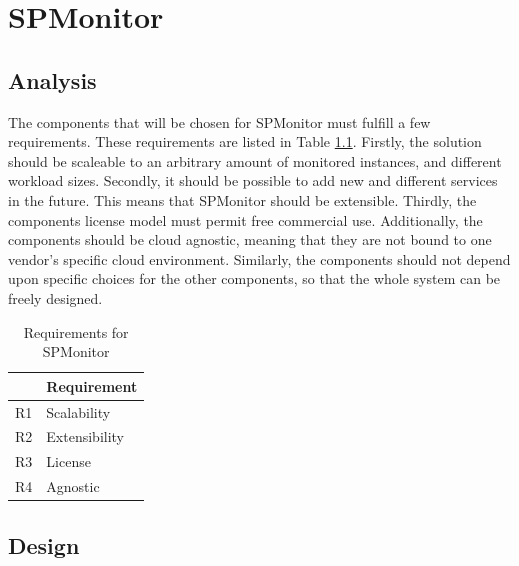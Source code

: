 \chapter{SPMonitor}




\section{Analysis}
The components that will be chosen for SPMonitor must fulfill a few requirements.
These requirements are listed in Table \ref{tab:requirements}.
Firstly, the solution should be scaleable to an arbitrary amount of monitored instances, and different workload sizes.
Secondly, it should be possible to add new and different services in the future. This means that SPMonitor should be extensible.
Thirdly, the components license model must permit free commercial use.
Additionally, the components should be cloud agnostic, meaning that they are not bound to one vendor's specific cloud environment.
Similarly, the components should not depend upon specific choices for the other components, so that the whole system can be freely designed.

\begin{table}[h]
\begin{tabular}{l|l}
	& Requirement       			\\
\hline
R1 	& Scalability 					\\
R2 	& Extensibility       			\\
R3 	& License			  			\\
R4 	& Agnostic       				\\
\end{tabular}
\caption{Requirements for SPMonitor}
\label{tab:requirements}
\end{table}


\section{Design}

